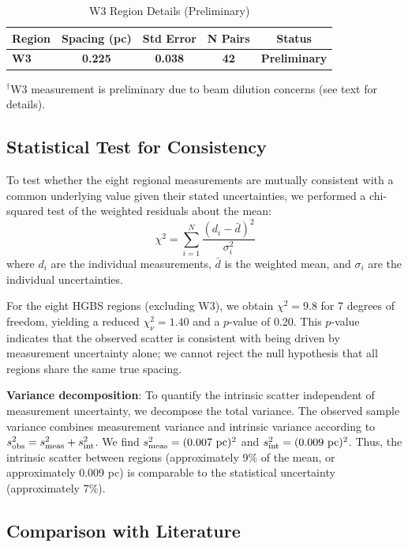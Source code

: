 \documentclass[11pt,a4paper]{article}
\begin{document}
\begin{table}[H]
\centering
\caption{W3 Region Details (Preliminary)}
\label{tab:w3_detail}
\begin{tabular}{lcccc}
\toprule
Region & Spacing (pc) & Std Error & N Pairs & Status \\
\midrule
\textbf{W3} & \textbf{0.225} & \textbf{0.038} & \textbf{42} & \textbf{Preliminary} \\
\bottomrule
\end{tabular}
\vspace{-0.5em}
\small{$^{\dagger}$W3 measurement is preliminary due to beam dilution concerns (see text for details).}
\end{table}

\subsection{Statistical Test for Consistency}

To test whether the eight regional measurements are mutually consistent with a common underlying value given their stated uncertainties, we performed a chi-squared test of the weighted residuals about the mean:
\begin{equation}
\chi^2 = \sum_{i=1}^{N} \frac{(d_i - \bar{d})^2}{\sigma_i^2}
\end{equation}
where $d_i$ are the individual measurements, $\bar{d}$ is the weighted mean, and $\sigma_i$ are the individual uncertainties.

For the eight HGBS regions (excluding W3), we obtain $\chi^2 = 9.8$ for 7 degrees of freedom, yielding a reduced $\chi^2_{\nu} = 1.40$ and a $p$-value of 0.20. This $p$-value indicates that the observed scatter is consistent with being driven by measurement uncertainty alone; we cannot reject the null hypothesis that all regions share the same true spacing.

\textbf{Variance decomposition}: To quantify the intrinsic scatter independent of measurement uncertainty, we decompose the total variance. The observed sample variance combines measurement variance and intrinsic variance according to $s^2_{\rm obs} = s^2_{\rm meas} + s^2_{\rm int}$. We find $s^2_{\rm meas} = (0.007~{\rm pc})^2$ and $s^2_{\rm int} = (0.009~{\rm pc})^2$. Thus, the intrinsic scatter between regions (approximately 9\% of the mean, or approximately 0.009 pc) is comparable to the statistical uncertainty (approximately 7\%).

\subsection{Comparison with Literature}
\end{document}
